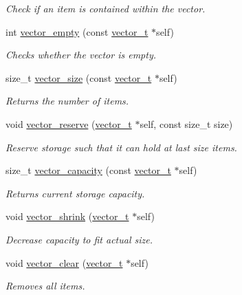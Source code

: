 \begin{DoxyCompactItemize}
\begin{DoxyCompactList}\small\item\em \-Check if an item is contained within the vector. \end{DoxyCompactList}\item 
int \hyperlink{group__vector_ga0d33ab9aaff247d38876b1fe76c4e2ef}{vector\-\_\-empty} (const \hyperlink{structvector__t}{vector\-\_\-t} $\ast$self)
\begin{DoxyCompactList}\small\item\em \-Checks whether the vector is empty. \end{DoxyCompactList}\item 
size\-\_\-t \hyperlink{group__vector_ga0103842074bb797fc685b33c0629c05a}{vector\-\_\-size} (const \hyperlink{structvector__t}{vector\-\_\-t} $\ast$self)
\begin{DoxyCompactList}\small\item\em \-Returns the number of items. \end{DoxyCompactList}\item 
void \hyperlink{group__vector_ga1a1e63e13a4da5587aa0b9369580eb85}{vector\-\_\-reserve} (\hyperlink{structvector__t}{vector\-\_\-t} $\ast$self, const size\-\_\-t size)
\begin{DoxyCompactList}\small\item\em \-Reserve storage such that it can hold at last size items. \end{DoxyCompactList}\item 
size\-\_\-t \hyperlink{group__vector_ga94c636cfdfd80206e765331d8b44651e}{vector\-\_\-capacity} (const \hyperlink{structvector__t}{vector\-\_\-t} $\ast$self)
\begin{DoxyCompactList}\small\item\em \-Returns current storage capacity. \end{DoxyCompactList}\item 
void \hyperlink{group__vector_ga0b9c4f4cf48f0c52daa7852aeb7e531c}{vector\-\_\-shrink} (\hyperlink{structvector__t}{vector\-\_\-t} $\ast$self)
\begin{DoxyCompactList}\small\item\em \-Decrease capacity to fit actual size. \end{DoxyCompactList}\item 
void \hyperlink{group__vector_gaa24245f42c8bb6f84933133f6a560deb}{vector\-\_\-clear} (\hyperlink{structvector__t}{vector\-\_\-t} $\ast$self)
\begin{DoxyCompactList}\small\item\em \-Removes all items. \end{DoxyCompactList}\item 

\end{DoxyCompactItemize}
